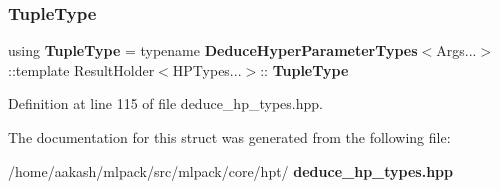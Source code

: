 \subsubsection{Tuple\+Type}
{\footnotesize\ttfamily using \textbf{ Tuple\+Type} =  typename \textbf{ Deduce\+Hyper\+Parameter\+Types}$<$Args...$>$\+::template Result\+Holder$<$H\+P\+Types...$>$\+::\textbf{ Tuple\+Type}}



Definition at line 115 of file deduce\+\_\+hp\+\_\+types.\+hpp.



The documentation for this struct was generated from the following file\+:\begin{DoxyCompactItemize}
\item 
/home/aakash/mlpack/src/mlpack/core/hpt/\textbf{ deduce\+\_\+hp\+\_\+types.\+hpp}\end{DoxyCompactItemize}
